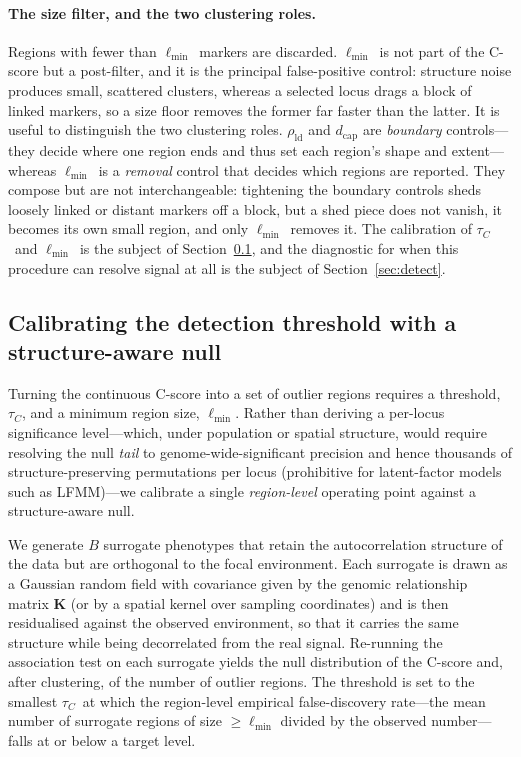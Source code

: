 \documentclass[11pt]{article}
\newcommand{\tauc}{\ensuremath{\tau_C}}
\newcommand{\lmin}{\ensuremath{\ell_{\min}}}
\begin{document}
\paragraph{The size filter, and the two clustering roles.}
Regions with fewer than \lmin\ markers are discarded. \lmin\ is not part of the
C-score but a post-filter, and it is the principal false-positive control:
structure noise produces small, scattered clusters, whereas a selected locus drags
a block of linked markers, so a size floor removes the former far faster than the
latter. It is useful to distinguish the two clustering roles.
$\rho_{\mathrm{ld}}$ and $d_{\mathrm{cap}}$ are \emph{boundary} controls---they
decide where one region ends and thus set each region's shape and extent---whereas
\lmin\ is a \emph{removal} control that decides which regions are reported. They
compose but are not interchangeable: tightening the boundary controls sheds
loosely linked or distant markers off a block, but a shed piece does not vanish,
it becomes its own small region, and only \lmin\ removes it. The calibration of
\tauc\ and \lmin\ is the subject of Section~\ref{sec:null}, and the diagnostic for
when this procedure can resolve signal at all is the subject of
Section~\ref{sec:detect}.

\subsection{Calibrating the detection threshold with a structure-aware null}
\label{sec:null}

Turning the continuous C-score into a set of outlier regions requires a
threshold, \tauc, and a minimum region size, \lmin. Rather than deriving a
per-locus significance level---which, under population or spatial structure,
would require resolving the null \emph{tail} to genome-wide-significant
precision and hence thousands of structure-preserving permutations per
locus (prohibitive for latent-factor models such as LFMM)---we calibrate a
single \emph{region-level} operating point against a structure-aware null.

We generate $B$ surrogate phenotypes that retain the autocorrelation structure
of the data but are orthogonal to the focal environment. Each surrogate is drawn
as a Gaussian random field with covariance given by the genomic relationship
matrix $\mathbf{K}$ (or by a spatial kernel over sampling coordinates) and is
then residualised against the observed environment, so that it carries the same
structure while being decorrelated from the real signal. Re-running the
association test on each surrogate yields the null distribution of the C-score
and, after clustering, of the number of outlier regions. The threshold is set to
the smallest \tauc\ at which the region-level empirical false-discovery
rate---the mean number of surrogate regions of size $\ge\lmin$ divided by the
observed number---falls at or below a target level.
\end{document}
